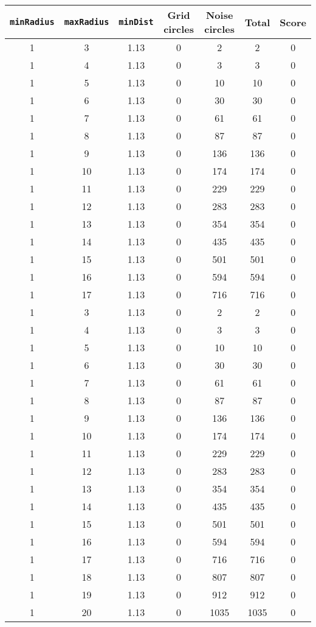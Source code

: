 \documentclass[letterpaper, 12pt]{article}
\begin{document}
\begin{longtable}{|c|c|c|c|c|c|c|}
\hline
\textbf{\texttt{minRadius}} & \textbf{\texttt{maxRadius}} & \textbf{\texttt{minDist}} & \textbf{Grid circles} & \textbf{Noise circles} & \textbf{Total} & \textbf{Score} \\
\hline
1 & 3 & 1.13 & 0 & 2 & 2 & 0 \\
\hline
1 & 4 & 1.13 & 0 & 3 & 3 & 0 \\
\hline
1 & 5 & 1.13 & 0 & 10 & 10 & 0 \\
\hline
1 & 6 & 1.13 & 0 & 30 & 30 & 0 \\
\hline
1 & 7 & 1.13 & 0 & 61 & 61 & 0 \\
\hline
1 & 8 & 1.13 & 0 & 87 & 87 & 0 \\
\hline
1 & 9 & 1.13 & 0 & 136 & 136 & 0 \\
\hline
1 & 10 & 1.13 & 0 & 174 & 174 & 0 \\
\hline
1 & 11 & 1.13 & 0 & 229 & 229 & 0 \\
\hline
1 & 12 & 1.13 & 0 & 283 & 283 & 0 \\
\hline
1 & 13 & 1.13 & 0 & 354 & 354 & 0 \\
\hline
1 & 14 & 1.13 & 0 & 435 & 435 & 0 \\
\hline
1 & 15 & 1.13 & 0 & 501 & 501 & 0 \\
\hline
1 & 16 & 1.13 & 0 & 594 & 594 & 0 \\
\hline
1 & 17 & 1.13 & 0 & 716 & 716 & 0 \\
\hline
1 & 3 & 1.13 & 0 & 2 & 2 & 0 \\
\hline
1 & 4 & 1.13 & 0 & 3 & 3 & 0 \\
\hline
1 & 5 & 1.13 & 0 & 10 & 10 & 0 \\
\hline
1 & 6 & 1.13 & 0 & 30 & 30 & 0 \\
\hline
1 & 7 & 1.13 & 0 & 61 & 61 & 0 \\
\hline
1 & 8 & 1.13 & 0 & 87 & 87 & 0 \\
\hline
1 & 9 & 1.13 & 0 & 136 & 136 & 0 \\
\hline
1 & 10 & 1.13 & 0 & 174 & 174 & 0 \\
\hline
1 & 11 & 1.13 & 0 & 229 & 229 & 0 \\
\hline
1 & 12 & 1.13 & 0 & 283 & 283 & 0 \\
\hline
1 & 13 & 1.13 & 0 & 354 & 354 & 0 \\
\hline
1 & 14 & 1.13 & 0 & 435 & 435 & 0 \\
\hline
1 & 15 & 1.13 & 0 & 501 & 501 & 0 \\
\hline
1 & 16 & 1.13 & 0 & 594 & 594 & 0 \\
\hline
1 & 17 & 1.13 & 0 & 716 & 716 & 0 \\
\hline
1 & 18 & 1.13 & 0 & 807 & 807 & 0 \\
\hline
1 & 19 & 1.13 & 0 & 912 & 912 & 0 \\
\hline
1 & 20 & 1.13 & 0 & 1035 & 1035 & 0 \\
\hline
\end{longtable}
\end{document}
